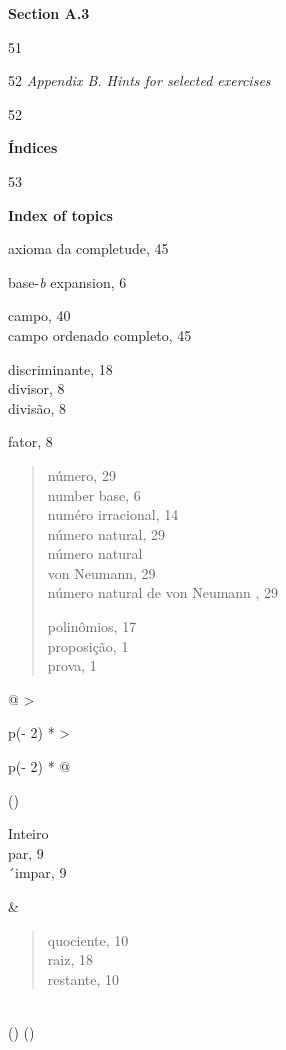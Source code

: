 \documentclass[
]{article}
\begin{document}
\textbf{Section A.3}

51

52 \emph{Appendix B. Hints for selected exercises}

52

\textbf{Índices}

53

\textbf{Index of topics}

axioma da completude, 45

base-\emph{b} expansion, 6

campo, 40\\
campo ordenado completo, 45

discriminante, 18\\
divisor, 8\\
divisão, 8

fator, 8

\begin{quote}
número, 29\\
number base, 6\\
numéro irracional, 14\\
número natural, 29\\
número natural\\
von Neumann, 29\\
número natural de von Neumann , 29

polinômios, 17\\
proposição, 1\\
prova, 1
\end{quote}

\begin{longtable}[]{@{}
  >{\raggedright\arraybackslash}p{(\columnwidth - 2\tabcolsep) * }
  >{\raggedright\arraybackslash}p{(\columnwidth - 2\tabcolsep) * }@{}}
\toprule()
\begin{minipage}[b]{\linewidth}\raggedright
Inteiro\\
par, 9\\
´impar, 9\strut
\end{minipage} & \begin{minipage}[b]{\linewidth}\raggedright
\begin{quote}
quociente, 10\\
raiz, 18\\
restante, 10
\end{quote}\strut
\end{minipage} \\
\midrule()
\endhead
\bottomrule()
\end{longtable}
\end{document}

